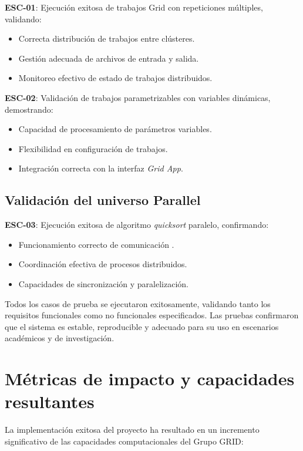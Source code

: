 \textbf{ESC-01}: Ejecución exitosa de trabajos Grid con repeticiones múltiples, validando:
\begin{itemize}
    \item Correcta distribución de trabajos entre clústeres.
    \item Gestión adecuada de archivos de entrada y salida.
    \item Monitoreo efectivo de estado de trabajos distribuidos.
\end{itemize}

\textbf{ESC-02}: Validación de trabajos parametrizables con variables dinámicas, demostrando:
\begin{itemize}
    \item Capacidad de procesamiento de parámetros variables.
    \item Flexibilidad en configuración de trabajos.
    \item Integración correcta con la interfaz \textit{Grid App}.
\end{itemize}

\subsection{Validación del universo Parallel}
\noindent

\textbf{ESC-03}: Ejecución exitosa de algoritmo \textit{quicksort} paralelo, confirmando:
\begin{itemize}
    \item Funcionamiento correcto de comunicación \MPI.
    \item Coordinación efectiva de procesos distribuidos.
    \item Capacidades de sincronización y paralelización.
\end{itemize}

Todos los casos de prueba se ejecutaron exitosamente, validando tanto los requisitos funcionales como no funcionales especificados. Las pruebas confirmaron que el sistema es estable, reproducible y adecuado para su uso en escenarios académicos y de investigación.

\section{Métricas de impacto y capacidades resultantes}
\noindent

La implementación exitosa del proyecto ha resultado en un incremento significativo de las capacidades computacionales del Grupo GRID:

